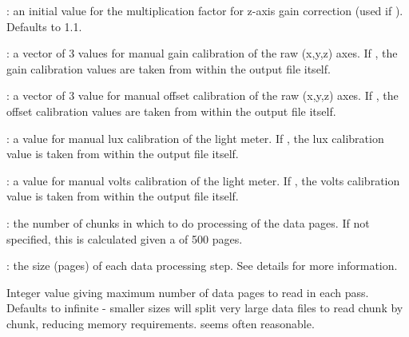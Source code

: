 \documentclass[a4paper]{book}
\begin{document}
\begin{Arguments}
\begin{ldescription}
: an initial value for the multiplication factor for z-axis gain correction (used if ).  Defaults to 1.1.\\{}

: a vector of 3 values for manual gain calibration of the raw (x,y,z) axes.  If , the gain calibration values are taken from within the output file itself.\\{}

: a vector of 3 value for manual offset calibration of the raw (x,y,z) axes.  If , the offset calibration values are taken from within the output file itself.\\{}

: a value for manual lux calibration of the light meter.  If , the lux calibration value is taken from within the output file itself.\\{}

: a value for manual volts calibration of the light meter.  If , the volts calibration value is taken from within the output file itself.\\{}

: the number of chunks in which to do processing of the data pages.  If not specified, this is calculated given a  of 500 pages.\\{}

: the size (pages) of each data processing step.  See details for more information.

\item[\code{blocksize}] 
Integer value giving maximum number of data pages to read in each pass. Defaults to infinite - smaller sizes will split very large data files to read chunk by chunk, reducing memory requirements.  seems often reasonable.


\end{ldescription}
\end{Arguments}
%
\end{document}
